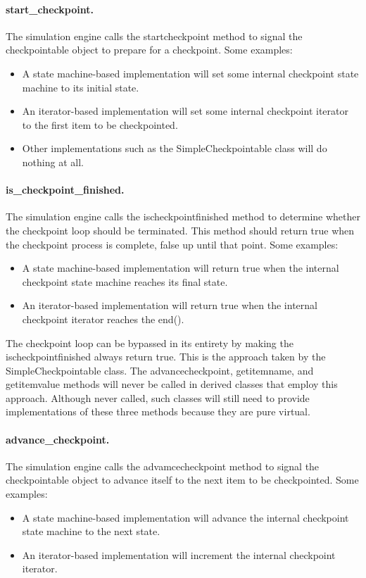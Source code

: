 \paragraph{start\_checkpoint.}
The simulation engine calls the start\funder{}checkpoint method to signal the
checkpointable object to prepare for a checkpoint. Some examples:
\begin{itemize}
\item A state machine-based implementation will set some
internal checkpoint state machine to its initial state.
\item An iterator-based implementation will set some
internal checkpoint iterator to the first item to be checkpointed.
\item Other implementations such as the SimpleCheckpointable class will do
nothing at all.
\end{itemize}

\paragraph{is\_checkpoint\_finished.}
The simulation engine calls the is\funder{}checkpoint\funder{}finished method to
determine whether the checkpoint loop should be terminated. This method should
return true when the checkpoint process is complete, false up until that point.
Some examples:
\begin{itemize}
\item A state machine-based implementation will return true when the
internal checkpoint state machine reaches its final state.
\item An iterator-based implementation will return true when the
internal checkpoint iterator reaches the end().
\end{itemize}
The checkpoint loop can be bypassed in its entirety by making the
is\funder{}checkpoint\funder{}finished always return true. This is the approach
taken by the SimpleCheckpointable class.  The advance\funder{}checkpoint,
get\funder{}item\funder{}name, and get\funder{}item\funder{}value methods will
never be called in derived classes that employ this approach. Although never
called, such classes will still need to provide implementations of these three
methods because they are pure virtual.

\paragraph{advance\_checkpoint.}
The simulation engine calls the advamce\funder{}checkpoint method to signal the
checkpointable object to advance itself to the next item to be checkpointed.
Some examples:
\begin{itemize}
\item A state machine-based implementation will advance the
internal checkpoint state machine to the next state.
\item An iterator-based implementation will increment the
internal checkpoint iterator.
\end{itemize}

